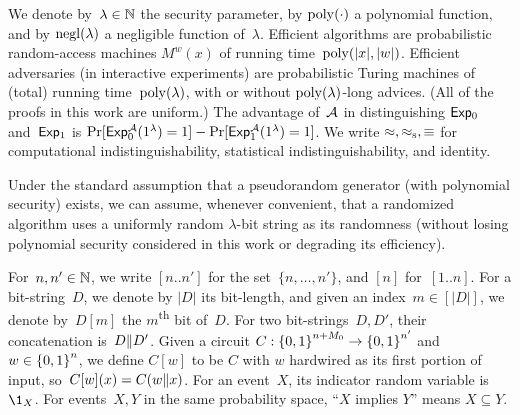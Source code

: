 We denote by~${\lambda\in{\mathbb{N}}}$ the security parameter,
by $\operatorname{poly}({\cdot})$ a polynomial function, and
by $\operatorname{negl}(\lambda)$ a negligible function of~$\lambda$.
Efficient algorithms are probabilistic random-access machines $M^w(x)$ of running time~$\operatorname{poly}(|x|,|w|)$.
Efficient adversaries (in interactive experiments) are probabilistic Turing machines of (total) running time~$\operatorname{poly}(\lambda)$,
with or without $\operatorname{poly}(\lambda)$-long advices.
(All of the proofs in this work are uniform.)
The advantage of~${\mathcal{A}}$ in distinguishing ${\smash{\mathsf{Exp}}}_0$ and~${\smash{\mathsf{Exp}}}_1$ is
${\Pr[{\smash{\mathsf{Exp}}}_0^{\mathcal{A}}(1^\lambda)=1]-\Pr[{\smash{\mathsf{Exp}}}_1^{\mathcal{A}}(1^\lambda)=1]}$.
We write $\approx,\approx_{\textup{s}},\equiv$ for computational indistinguishability, statistical indistinguishability, and identity.

Under the standard assumption that a pseudorandom generator (with polynomial security) exists,
we can assume, whenever convenient, that a randomized algorithm uses a uniformly random $\lambda$-bit string as its randomness (without losing polynomial security considered in this work or degrading its efficiency).

For~${n,n'\in{\mathbb{N}}}$, we write $[n..n']$ for the set~$\{n,\dots,n'\}$,
and $[n]$ for~$[1..n]$.
For a bit-string~$D$, we denote by $|D|$ its bit-length,
and given an index~${m\in[|D|]}$, we denote by~$D[m]$ the $m$\textsuperscript{th} bit of~$D$.
For two bit-strings~$D,D'$, their concatenation is~${D{\parallel} D'}$.
Given a circuit ${C:{\{0,1\}}^{n+M_0}\to{\{0,1\}}^{n'}}$ and ${w\in{\{0,1\}}^n}$, we define $C[w]$ to be $C$ with $w$ hardwired as its first portion of input,
so~${C[w](x)=C(w{\parallel} x)}$.
For an event~$X$, its indicator random variable is~$\1_X$.
For events~$X,Y$ in the same probability space, ``$X$ implies $Y$'' means ${X\subseteq Y}$.
